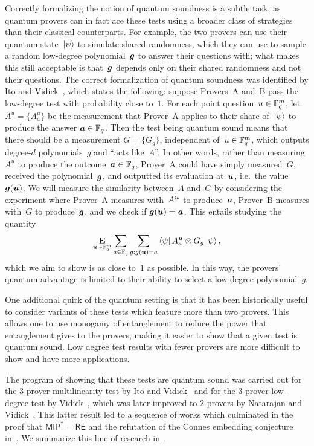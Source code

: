 Correctly formalizing the notion of quantum soundness is a subtle task,
as quantum provers can in fact ace these tests
using a broader class of strategies than their classical counterparts.
For example, the two provers can use their quantum state~$\ket{\psi}$ to simulate shared randomness,
which they can use to sample a random low-degree polynomial~$\boldsymbol{g}$  to answer their questions with;
what makes this still acceptable is that~$\boldsymbol{g}$ depends only on their shared randomness and not their questions.
The correct formalization of quantum soundness was identified by Ito and Vidick~\cite{IV12},
which states the following:
suppose Provers~$\mathrm{A}$ and~$\mathrm{B}$ pass the low-degree test with probability close to~$1$.
For each point question~$u \in \mathbb F_q^m$,
let $A^{u} = \{A^{u}_a\}$ be the measurement that Prover~$\mathrm{A}$ applies to
their share of~$\ket{\psi}$ to produce the answer $\boldsymbol{a} \in \mathbb F_q$.
Then the test being quantum sound
means that there should be a measurement $G = \{G_g\}$, independent of~$u \in \mathbb F_q^m$,
which outputs degree-$d$ polynomials~$g$
and ``acts like~$A$''.
In other words, rather than measuring~$A^{u}$ to produce the outcome~$\boldsymbol{a} \in \mathbb F_q$,
Prover~$\mathrm{A}$ could have simply measured~$G$, received the polynomial~$\boldsymbol{g}$,
and outputted its evaluation at~$\boldsymbol{u}$, i.e.\ the value $\boldsymbol{g}(\boldsymbol{u})$.
We will measure the similarity between~$A$ and~$G$
by considering the experiment where Prover~$\mathrm{A}$ measures with~$A^{\boldsymbol{u}}$ to produce~$\boldsymbol{a}$,
Prover~$\mathrm{B}$ measures with~$G$ to produce~$\boldsymbol{g}$, and we check if $\boldsymbol{g}(\boldsymbol{u}) = \boldsymbol{a}$.
This entails studying the quantity
\begin{equation*}
\mathop{\bf E\/}_{\boldsymbol{u} \sim \mathbb F_q^m} \sum_{a \in \mathbb F_q} \sum_{g:g(\boldsymbol{u}) = a}\bra{\psi} A^{\boldsymbol{u}}_a \otimes G_g \ket{\psi},
\end{equation*}
which we aim to show is as close to~$1$ as possible.
In this way, the provers' quantum advantage is limited to their ability to select a low-degree polynomial~$g$.

One additional quirk of the quantum setting
is that it has been historically useful to consider variants of these tests which feature more than two provers.
This allows one to use monogamy of entanglement to reduce the power that entanglement gives to the provers,
making it easier to show that a given test is quantum sound.
Low degree test results with fewer provers are more difficult to show and have more applications.

The program of showing that these tests are quantum sound was carried out for the $3$-prover multilinearity test by Ito and Vidick~\cite{IV12}
and for the $3$-prover low-degree test by Vidick~\cite{Vid16},
which was later improved to $2$-provers by Natarajan and Vidick~\cite{NV18b}.
This latter result led to a sequence of works
which culminated in the proof that $\mathsf{MIP}^* = \mathsf{RE}$
and the refutation of the Connes embedding conjecture in~\cite{JNV+20}.
We summarize this line of research in .



